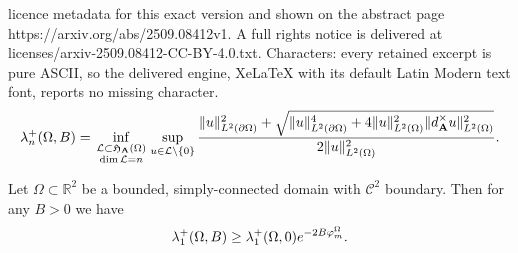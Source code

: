 \documentclass[10pt,a4paper]{amsart}
\def\dR{{\mathbb R}}
\def\lm{\lambda}
\def\p{\partial}
\def\sH{{\mathfrak H}}   \def\sI{{\mathfrak I}}
\newcommand\Omg{\Omega}
\newcommand\cL{\mathcal L}
\newcommand\sm{\setminus}
\begin{document}
licence metadata for this exact version and shown on the abstract page https://arxiv.org/abs/2509.08412v1. A full rights notice is delivered at licenses/arxiv-2509.08412-CC-BY-4.0.txt. Characters: every retained excerpt is pure ASCII, so the delivered engine, XeLaTeX with its default Latin Modern text font, reports no missing character.
\begin{equation}\label{eq:minmaxDirac}
	\lm_n^+(\Omg,B) = \inf_{\begin{smallmatrix} \cL\subset\sH_{{\bf A}}(\Omg)\\ \dim \cL = n\end{smallmatrix}}\sup_{u\in\cL\sm\{0\}} \frac{\|u\|^2_{L^2(\p\Omg)} + \sqrt{\|u\|^4_{L^2(\p\Omg)}+ 4\|u\|^2_{L^2(\Omg)} \|d_{\bf A}^\times u\|^2_{L^2(\Omg)}}}{2\|u\|^2_{L^2(\Omg)}}.
\end{equation}

\begin{lemma}\label{lem.lower.dirac}
	Let $\Omg\subset\dR^2$ be a bounded, simply-connected domain with $\mathscr C^2$ boundary. Then for any $B > 0$ we have
	\[
		\lm_1^+(\Omg,B) \ge \lm_1^+(\Omg,0) e^{-2B\varphi^\Omg_{\rm m}}.
	\]
\end{lemma}
\end{document}
